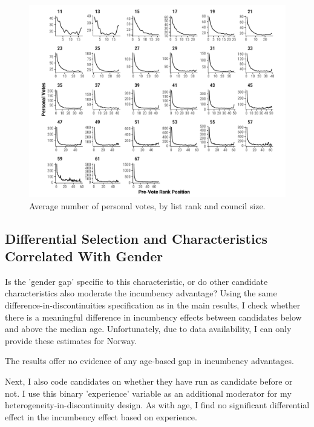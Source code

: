 \documentclass[12pt]{article}
\begin{document}
\begin{figure}[htbp]
    \centering
    \includegraphics[width = .9\textwidth]{../output/figures/norway_pv_by_rank.pdf}
    \caption{Average number of personal votes, by list rank and council size.}
    \label{fig:pv_by_rank}
\end{figure}

\clearpage
\subsection{Differential Selection and Characteristics Correlated With Gender}
\label{app:age_rd}

Is the 'gender gap' specific to this characteristic, or do other candidate characteristics also moderate the incumbency advantage? Using the same difference-in-discontinuities specification as in the main results, I check whether there is a meaningful difference in incumbency effects between candidates below and above the median age. Unfortunately, due to data availability, I can only provide these estimates for Norway.



The results offer no evidence of any age-based gap in incumbency advantages.

Next, I also code candidates on whether they have run as candidate before or not. I use this binary 'experience' variable as an additional moderator for my heterogeneity-in-discontinuity design. As with age, I find no significant differential effect in the incumbency effect based on experience.


\end{document}

